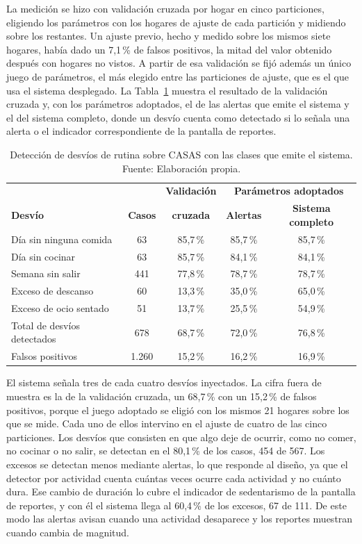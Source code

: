 La medición se hizo con validación cruzada por hogar en cinco particiones, eligiendo los parámetros con los hogares de ajuste de cada partición y midiendo sobre los restantes.
Un ajuste previo, hecho y medido sobre los mismos siete hogares, había dado un 7,1\,\% de falsos positivos, la mitad del valor obtenido después con hogares no vistos.
A partir de esa validación se fijó además un único juego de parámetros, el más elegido entre las particiones de ajuste, que es el que usa el sistema desplegado.
La Tabla~\ref{tab:baseline_cv} muestra el resultado de la validación cruzada y, con los parámetros adoptados, el de las alertas que emite el sistema y el del sistema completo, donde un desvío cuenta como detectado si lo señala una alerta o el indicador correspondiente de la pantalla de reportes.

\begin{table}[H]
\centering
\caption[Detección de desvíos de rutina con validación cruzada por hogar.]{Detección de desvíos de rutina sobre CASAS con las clases que emite el sistema. Fuente: Elaboración propia.}
\label{tab:baseline_cv}
\small
\begin{tabular}{@{}lcccc@{}}
\toprule
& & \textbf{Validación} & \multicolumn{2}{c}{\textbf{Parámetros adoptados}} \\
\textbf{Desvío} & \textbf{Casos} & \textbf{cruzada} & \textbf{Alertas} & \textbf{Sistema completo} \\
\midrule
Día sin ninguna comida & 63 & 85,7\,\% & 85,7\,\% & 85,7\,\% \\
Día sin cocinar & 63 & 85,7\,\% & 84,1\,\% & 84,1\,\% \\
Semana sin salir & 441 & 77,8\,\% & 78,7\,\% & 78,7\,\% \\
Exceso de descanso & 60 & 13,3\,\% & 35,0\,\% & 65,0\,\% \\
Exceso de ocio sentado & 51 & 13,7\,\% & 25,5\,\% & 54,9\,\% \\
\midrule
Total de desvíos detectados & 678 & 68,7\,\% & 72,0\,\% & 76,8\,\% \\
Falsos positivos & 1.260 & 15,2\,\% & 16,2\,\% & 16,9\,\% \\
\bottomrule
\end{tabular}
\end{table}

El sistema señala tres de cada cuatro desvíos inyectados.
La cifra fuera de muestra es la de la validación cruzada, un 68,7\,\% con un 15,2\,\% de falsos positivos, porque el juego adoptado se eligió con los mismos 21 hogares sobre los que se mide.
Cada uno de ellos intervino en el ajuste de cuatro de las cinco particiones.
Los desvíos que consisten en que algo deje de ocurrir, como no comer, no cocinar o no salir, se detectan en el 80,1\,\% de los casos, 454 de 567.
Los excesos se detectan menos mediante alertas, lo que responde al diseño, ya que el detector por actividad cuenta cuántas veces ocurre cada actividad y no cuánto dura.
Ese cambio de duración lo cubre el indicador de sedentarismo de la pantalla de reportes, y con él el sistema llega al 60,4\,\% de los excesos, 67 de 111.
De este modo las alertas avisan cuando una actividad desaparece y los reportes muestran cuando cambia de magnitud.

